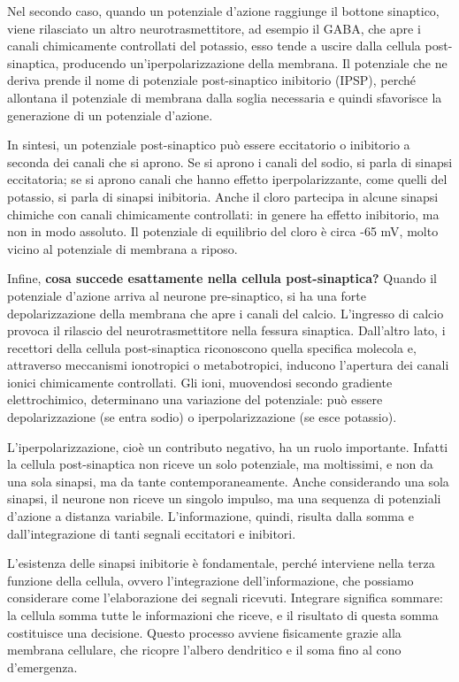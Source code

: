 \documentclass[12pt,a4paper]{book}
\begin{document}
Nel secondo caso, quando un potenziale d'azione raggiunge il bottone sinaptico, viene rilasciato un altro neurotrasmettitore, ad esempio il GABA, che apre i canali chimicamente controllati del potassio, esso tende a uscire dalla cellula post-sinaptica, producendo un'iperpolarizzazione della membrana. Il potenziale che ne deriva prende il nome di potenziale post-sinaptico inibitorio (IPSP), perché allontana il potenziale di membrana dalla soglia necessaria e quindi sfavorisce la generazione di un potenziale d'azione.

In sintesi, un potenziale post-sinaptico può essere eccitatorio o inibitorio a seconda dei canali che si aprono. Se si aprono i canali del sodio, si parla di sinapsi eccitatoria; se si aprono canali che hanno eﬀetto iperpolarizzante, come quelli del potassio, si parla di sinapsi inibitoria. Anche il cloro partecipa in alcune sinapsi chimiche con canali chimicamente controllati: in genere ha eﬀetto inibitorio, ma non in modo assoluto. Il potenziale di equilibrio del cloro è circa -65 mV, molto vicino al potenziale di membrana a riposo.

Infine, \textbf{cosa succede esattamente nella cellula post-sinaptica? }Quando il potenziale d'azione arriva al neurone pre-sinaptico, si ha una forte depolarizzazione della membrana che apre i canali del calcio. L'ingresso di calcio provoca il rilascio del neurotrasmettitore nella fessura sinaptica. Dall'altro lato, i recettori della cellula post-sinaptica riconoscono quella specifica molecola e, attraverso meccanismi ionotropici o metabotropici, inducono l'apertura dei canali ionici chimicamente controllati. Gli ioni, muovendosi secondo gradiente elettrochimico, determinano una variazione del potenziale: può essere depolarizzazione (se entra sodio) o iperpolarizzazione (se esce potassio).

L'iperpolarizzazione, cioè un contributo negativo, ha un ruolo importante. Infatti la cellula post-sinaptica non riceve un solo potenziale, ma moltissimi, e non da una sola sinapsi, ma da tante contemporaneamente. Anche considerando una sola sinapsi, il neurone non riceve un singolo impulso, ma una sequenza di potenziali d'azione a distanza variabile. L'informazione, quindi, risulta dalla somma e dall'integrazione di tanti segnali eccitatori e inibitori.

L'esistenza delle sinapsi inibitorie è fondamentale, perché interviene nella terza funzione della cellula, ovvero l'integrazione dell'informazione, che possiamo considerare come l'elaborazione dei segnali ricevuti. Integrare significa sommare: la cellula somma tutte le informazioni che riceve, e il risultato di questa somma costituisce una decisione. Questo processo avviene fisicamente grazie alla membrana cellulare, che ricopre l'albero dendritico e il soma fino al cono d'emergenza.
\end{document}
